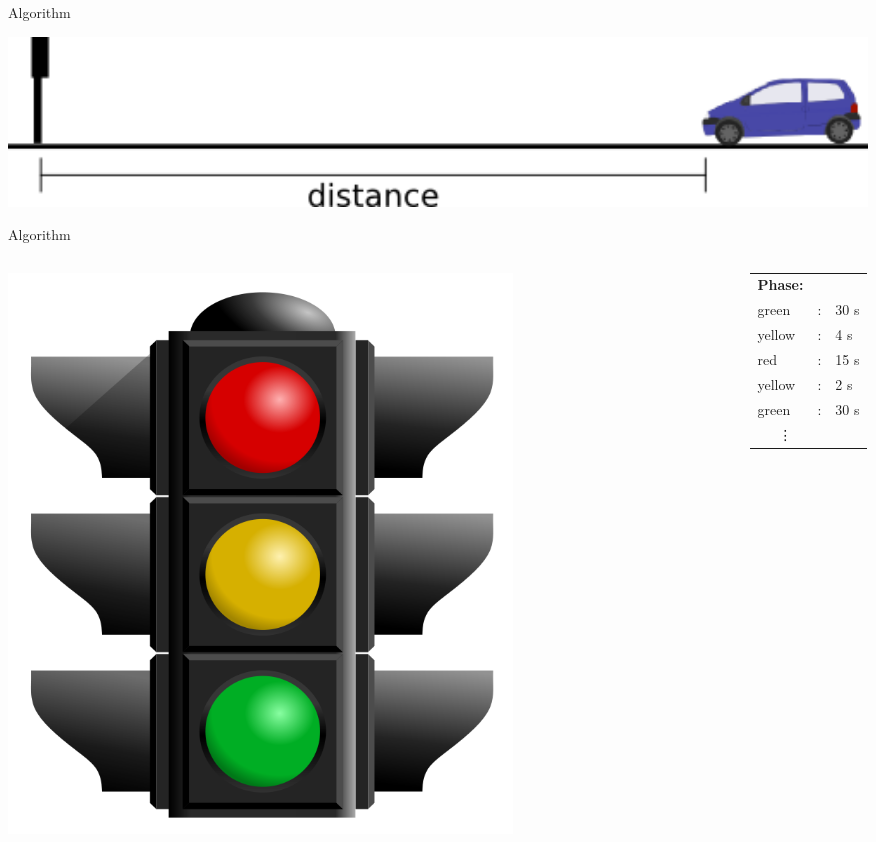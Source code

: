 \begin{frame}{Algorithm}
\begin{center}
\includegraphics[width=1\textwidth]{images/algdistance.png}
\end{center}
\end{frame}

\begin{frame}{Algorithm}
\begin{columns}
\begin{column}{0.5\textwidth}
\begin{center}
\includegraphics[width=0.7\textwidth]{images/traffic_light.png}
\end{center}
\end{column}
\begin{column}{0.5\textwidth}
\begin{center}
\begin{tabular}{lll}
\textbf{Phase:}&&\\
green & : & 30 s \\
yellow & : &  4 s \\
red & : & 15 s \\
yellow & : & 2 s \\
green & : & 30 s\\
\ \ \ \vdots&&\\
\end{tabular}
\end{center}
\end{column}
\end{columns}
\end{frame}

